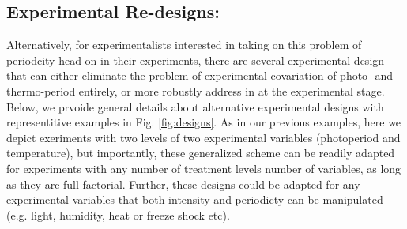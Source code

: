 \documentclass[11pt]{article}
\begin{document}
\subsection*{Experimental Re-designs:}
Alternatively, for experimentalists interested in taking on this problem of periodcity head-on in their experiments, there are several experimental design that can either eliminate the problem of experimental covariation  of photo- and thermo-period entirely, or more robustly address in at the experimental stage. Below, we prvoide general details about alternative experimental designs with representitive examples in Fig. \ref{fig:designs}. As in our previous examples, here we depict exeriments with two levels of two experimental variables (photoperiod and temperature), but importantly, these generalized scheme can be readily adapted for experiments with any number of treatment levels number of variables, as long as they are full-factorial. Further, these designs could be adapted for any experimental variables that both intensity and periodicty can be manipulated (e.g. light, humidity, heat or freeze shock etc).
\end{document}
